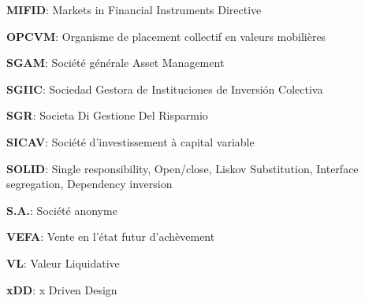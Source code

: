 \par \textbf{MIFID}: Markets in Financial Instruments Directive \\
\par \textbf{OPCVM}: Organisme de placement collectif en valeurs mobilières \\
\par \textbf{SGAM}: Société générale Asset Management \\
\par \textbf{SGIIC}: Sociedad Gestora de Instituciones de Inversión Colectiva \\
\par \textbf{SGR}: Societa Di Gestione Del Risparmio \\
\par \textbf{SICAV}: Société d'investissement à capital variable \\
\par \textbf{SOLID}: Single responsibility, Open/close, Liskov Substitution, Interface segregation, Dependency inversion \\
\par \textbf{S.A.}: Société anonyme \\
\par \textbf{VEFA}: Vente en l'état futur d'achèvement \\
\par \textbf{VL}: Valeur Liquidative \\
\par \textbf{xDD}: x Driven Design \\
\clearpage